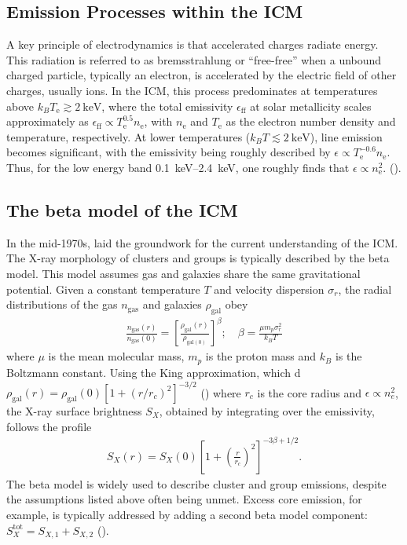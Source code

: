 \subsection{Emission Processes within the ICM}\label{subsec:emission}
A key principle of electrodynamics is that accelerated charges radiate energy. This radiation is referred to as bremsstrahlung or \enquote{free-free} when a unbound charged particle, typically an electron, is accelerated by the electric field of other charges, usually ions. In the ICM, this process predominates at temperatures above \(k_B T_\text{e} \gtrsim \SI{2}{\kilo\electronvolt}\), where the total emissivity \(\epsilon_{\text{ff}}\) at solar metallicity scales approximately as \(\epsilon_{\text{ff}} \propto T_\text{e}^{0.5} n_\text{e}\), 
with \(n_\text{e}\) and \(T_\text{e}\) as the electron number density and temperature, respectively. At lower temperatures (\(k_B T \lesssim \SI{2}{\kilo\electronvolt}\)), line emission becomes significant, with the emissivity being roughly described by \(\epsilon \propto T_\text{e}^{-0.6} n_\text{e}\).
Thus, for the low energy band \SIrange{0.1}{2.4}{\kilo\electronvolt}, one roughly finds that \(\epsilon \propto n_\text{e}^2.\) (\cite{Reiprich2019}).
%
\subsection{The beta model of the ICM}\label{sec:beta_model}
In the mid-1970s, \cite{Cavaliere_1976} laid the groundwork for the current understanding of the ICM. The X-ray morphology of clusters and groups is typically described by the beta model. This model assumes gas and galaxies share the same gravitational potential. Given a constant temperature \(T\) and velocity dispersion \(\sigma_r\), the radial distributions of the gas \(n_{\text{gas}}\) and galaxies \(\rho_{\text{gal}}\) obey
\begin{align*}
    \frac{n_\text{gas}(r)}{n_{\text{gas}}(0)} = \left[\frac{\rho_{\text{gal}}(r)}{\rho_{\text{gal}(0)}}\right]^{\beta}; \quad \beta = \frac{\mu m_p \sigma_r^2}{k_BT}
\end{align*}
where \(\mu\) is the mean molecular mass, \(m_p\) is the proton mass and \(k_B\) is the Boltzmann constant. Using the King approximation, which d \({\textstyle \rho_{\text{gal}}(r) = \rho_{\text{gal}}(0)[1 + (r/r_c)^2]^{-3/2}}\) (\cite{King1962}) where \(r_c\) is the core radius and \(\epsilon \propto n_e^2\), the X-ray surface brightness \(S_X\), obtained by integrating over the emissivity, follows the profile 
\begin{align*}
    S_X(r) = S_X(0)\left[1 + \left(\frac{r}{r_c}\right)^2\right]^{-3\beta + 1/2}.
\end{align*}
The beta model is widely used to describe cluster and group emissions, despite the assumptions listed above often being unmet. Excess core emission, for example, is typically addressed by adding a second beta model component: \(S_X^{\text{tot}} = S_{X,1} + S_{X,2}\) (\cite{Reiprich2019}).
%
